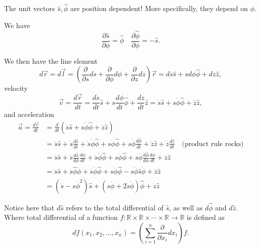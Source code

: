 \begin{note}
The unit vectors $\hat{s}, \hat{\phi}$ are position dependent! More
specifically, they depend on $\phi$.

We have
\[ \frac{\partial \hat{s}}{\partial \phi} = \hat{\phi} \quad
\frac{\partial \hat{\phi}}{\partial \phi} = -\hat{s}. \]
\end{note}

\begin{cor}
We then have the line element
\[ d \vec{r} = d \vec{l} = \left( \frac{\partial}{\partial s} ds +
\frac{\partial}{\partial \phi} d \phi + \frac{\partial}{\partial z} dz
\right) \vec{r} = ds \hat{s} + s d \phi \hat{\phi} + dz \hat{z}, \]
velocity
\[ \vec{v} = \frac{d \vec{r}}{dt} = \frac{ds}{dt} \hat{s} + s \frac{d
\phi}{dt} \hat{\phi} + \frac{dz}{dt} \hat{z} = \dot{s} \hat{s} + s
\dot{\phi} \hat{\phi} + \dot{z} \hat{z}, \]
and acceleration
\[ \begin{aligned}
\vec{a} = \frac{d \vec{v}}{dt} &= \frac{d}{dt} \left( \dot{s} \hat{s}
+ s \dot{\phi} \hat{\phi} + \dot{z} \hat{z} \right) \\
&= \ddot{s} \hat{s} + \dot{s} \frac{d \hat{s}}{dt}  + \dot{s} \dot{\phi}
\hat{\phi} + s \ddot{\phi} \hat{\phi} + s \dot{\phi} \frac{d
\hat{\phi}}{dt} + \ddot{z} \hat{z} + \dot{z} \frac{d \hat{z}}{dt} \quad
\textrm{(product rule rocks)} \\
&= \ddot{s} \hat{s} + \dot{s} \frac{d \hat{s}}{d \phi}\frac{d \phi}{dt}
+ \dot{s} \dot{\phi} \hat{\phi} + s \ddot{\phi} \hat{\phi} + s
\dot{\phi} \frac{d \hat{\phi}}{d \phi} \frac{d \phi}{dt} + \ddot{z}
\hat{z} \\
&= \ddot{s} \hat{s} + \dot{s} \hat{\phi} \dot{\phi} + \dot{s} \dot{\phi}
\hat{\phi} + s \ddot{\phi} \hat{\phi} - s \dot{\phi} \hat{s} \dot{\phi}
+ \ddot{z} \hat{z} \\
&= \left( \ddot{s} - s \dot{\phi}^2 \right) \hat{s} + \left( s
\ddot{\phi} + 2 \dot{s} \dot{\phi} \right) \hat{\phi} + \ddot{z} \hat{z}
\end{aligned} \]
\end{cor}

\begin{rem}
Notice here that $d \hat{s}$ refers to the total differential of
$\hat{s}$, as well as $d \hat{\phi}$ and $d \hat{z}$. Where total
differential of a function $f : \mathbb{R} \times \mathbb{R} \times
\cdots \times \mathbb{R} \to \mathbb{R}$ is defined as
\[ df(x_1, x_2, \dots, x_n) = \left( \sum_{i = 1}^n
\frac{\partial}{\partial x_i} d x_i \right) f. \]
\end{rem}

